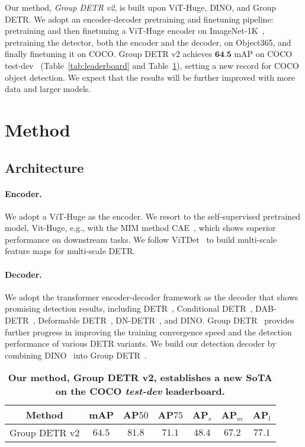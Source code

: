 \documentclass[10pt,twocolumn,letterpaper]{article}
\begin{document}
Our method, {\em Group DETR v2}, is built upon ViT-Huge, DINO, and Group DETR. 
We adopt an encoder-decoder pretraining and finetuning pipeline: 
pretraining and then
finetuning a ViT-Huge encoder on ImageNet-1K~\cite{deng2009imagenet}, 
pretraining the detector, both the encoder and the decoder, on Object365, 
and finally finetuning it on COCO. 
Group DETR v2 achieves $\textbf{64.5}$ mAP on COCO test-dev~\cite{lin2014microsoft} (Table~\ref{tab:leaderboard} and Table~\ref{tab:coco_dev}), setting a new record for COCO object detection. 
We expect that the results will be further improved with more data and larger models. 

\section{Method} \label{sec:method}

\subsection{Architecture} \label{modeling}

\paragraph{Encoder.}
We adopt a ViT-Huge as the encoder.  We resort to the self-supervised pretrained model, Vit-Huge, e.g., with the MIM method CAE~\cite{chen2022context},
which shows superior performance on downstream tasks. 
We follow ViTDet~\cite{li2022exploring} to build multi-scale feature maps for multi-scale DETR.

\paragraph{Decoder.}
We adopt the transformer encoder-decoder framework as the decoder that shows promising detection results, including DETR~\cite{carion2020end}, Conditional DETR~\cite{meng2021conditional}, DAB-DETR~\cite{liu2022dab}, Deformable DETR~\cite{zhu2020deformable}, DN-DETR~\cite{li2022dn}, and DINO\cite{zhang2022dino}. Group DETR~\cite{chen2022group} provides further progress in improving the training convergence speed and the detection performance of various DETR variants. 
We build our detection decoder by combining DINO~\cite{zhang2022dino} 
into Group DETR~\cite{chen2022group}.


\begin{table}
  \centering
    \setlength{\tabcolsep}{5pt}
    \renewcommand{\arraystretch}{1.3}
    \footnotesize    
  \caption{\textbf{Our method, Group DETR v2, establishes
  a new SoTA on the COCO {\em test-dev} leaderboard.} }
  \begin{tabular}{c|cccccc}
    \toprule
    Method &  mAP & AP$50$ &  AP$75$ & AP$_s$ & AP$_m$ & AP$_l$ \\
    \midrule
    Group DETR v2  & $\mathbf{64.5}$ & $81.8$ & $71.1$ & $48.4$ & $67.2$ & $77.1$ \\
    \bottomrule
  \end{tabular}
  \label{tab:coco_dev}
\end{table}
\end{document}
